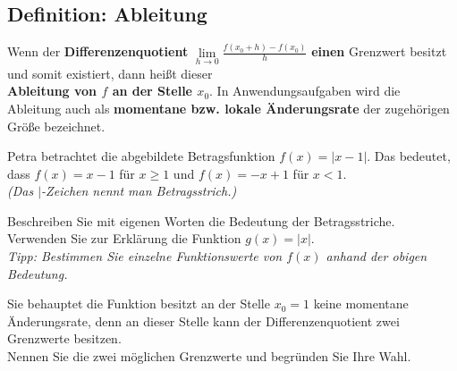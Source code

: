 		\subsection*{Definition: Ableitung}
			\begin{tcolorbox}
				Wenn der \textbf{Differenzenquotient} $\lim\limits_{h\rightarrow0}{\frac{f(x_0+h)-f(x_0)}{h}}$ \textbf{einen} Grenzwert besitzt und somit existiert, dann heißt dieser\\
				
				\textbf{	Ableitung von $f$ an der Stelle $x_0$}.
				\tcblower
				In Anwendungsaufgaben wird die Ableitung auch als\textbf{ momentane bzw. lokale Änderungsrate} der zugehörigen Größe bezeichnet. 
			\end{tcolorbox}
			Petra betrachtet die abgebildete Betragsfunktion $f(x)=\left\vert x-1\right\vert$. Das bedeutet, dass $f(x)=x-1$ für $x\geq 1$ und $f(x)=-x+1$ für $x<1$. \\
			
			\textit{(Das $\vert$-Zeichen nennt man Betragsstrich.)}
			\begin{enumerate}[a)]
				\begin{minipage}{0.7\textwidth}
						\item Beschreiben Sie mit eigenen Worten die Bedeutung der Betragsstriche. Verwenden Sie zur Erklärung die Funktion $g(x)=\left\vert x\right\vert$.\\ 
						
						\textit{Tipp: Bestimmen Sie einzelne Funktionswerte von $f(x)$ anhand der obigen Bedeutung.}
						\item Sie behauptet die Funktion besitzt an der Stelle $x_0=1$ keine momentane Änderungsrate, denn an dieser Stelle kann der Differenzenquotient zwei Grenzwerte besitzen.\\
						
						Nennen Sie die zwei möglichen Grenzwerte und begründen Sie Ihre Wahl. 
				\end{minipage}%
				\begin{minipage}{0.3\textwidth}
				\end{minipage}
			\end{enumerate}\vspace{-0.4cm}
